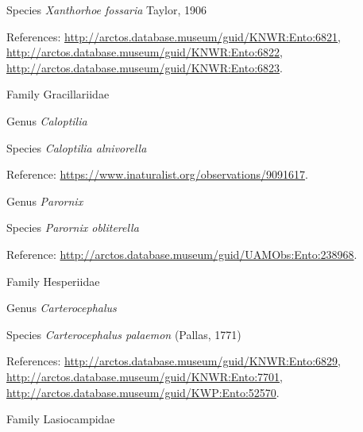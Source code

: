 \documentclass[9pt, article]{memoir}
\begin{document}
\begin{multicols}{2}
\vspace{6pt}\noindent\hspace{36pt}Species \textit{Xanthorhoe fossaria} Taylor, 1906


\vspace{6pt}References: 
\url{http://arctos.database.museum/guid/KNWR:Ento:6821}, 
\url{http://arctos.database.museum/guid/KNWR:Ento:6822}, 
\url{http://arctos.database.museum/guid/KNWR:Ento:6823}.

\vspace{6pt}\noindent\hspace{24pt}Family Gracillariidae


\vspace{6pt}\noindent\hspace{30pt}Genus \textit{Caloptilia}


\vspace{6pt}\noindent\hspace{36pt}Species \textit{Caloptilia alnivorella}


\vspace{6pt}Reference: 
\url{https://www.inaturalist.org/observations/9091617}.

\vspace{6pt}\noindent\hspace{30pt}Genus \textit{Parornix}


\vspace{6pt}\noindent\hspace{36pt}Species \textit{Parornix obliterella}


\vspace{6pt}Reference: 
\url{http://arctos.database.museum/guid/UAMObs:Ento:238968}.

\vspace{6pt}\noindent\hspace{24pt}Family Hesperiidae


\vspace{6pt}\noindent\hspace{30pt}Genus \textit{Carterocephalus}


\vspace{6pt}\noindent\hspace{36pt}Species \textit{Carterocephalus palaemon} (Pallas, 1771)


\vspace{6pt}References: 
\url{http://arctos.database.museum/guid/KNWR:Ento:6829}, 
\url{http://arctos.database.museum/guid/KNWR:Ento:7701}, 
\url{http://arctos.database.museum/guid/KWP:Ento:52570}.

\vspace{6pt}\noindent\hspace{24pt}Family Lasiocampidae



\end{multicols}
\end{document}

